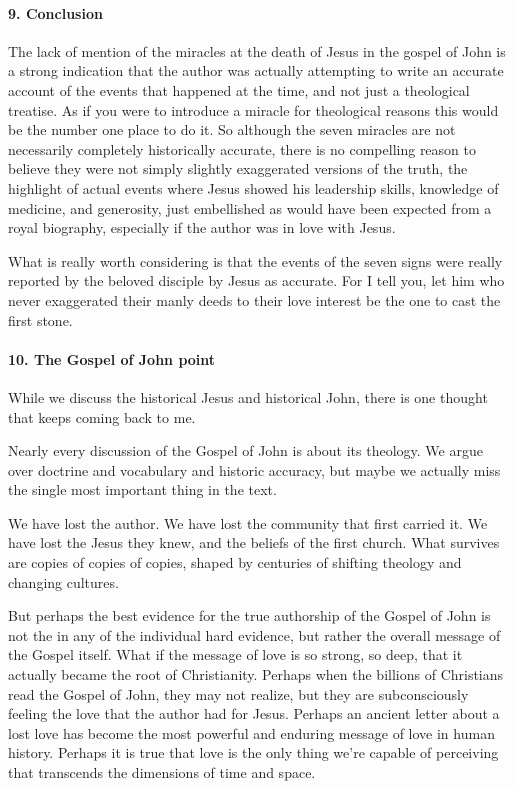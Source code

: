 \paragraph{9.
Conclusion}\label{par:conclusion}

The lack of mention of the miracles at the death of Jesus in the gospel of John is a strong indication that the author was actually attempting to write an accurate account of the events that happened at the time, and not just a theological treatise.
As if you were to introduce a miracle for theological reasons this would be the number one place to do it.
So although the seven miracles are not necessarily completely historically accurate, there is no compelling reason to believe they were not simply slightly exaggerated versions of the truth, the highlight of actual events where Jesus showed his leadership skills, knowledge of medicine, and generosity, just embellished as would have been expected from a royal biography, especially if the author was in love with Jesus.

What is really worth considering is that the events of the seven signs were really reported by the beloved disciple by Jesus as accurate.
For I tell you, let him who never exaggerated their manly deeds to their love interest be the one to cast the first stone.

\paragraph{10.
The Gospel of John point}\label{par:the-gospel-of-john-point}

While we discuss the historical Jesus and historical John, there is one thought that keeps coming back to me.

Nearly every discussion of the Gospel of John is about its theology.
We argue over doctrine and vocabulary and historic accuracy, but maybe we actually miss the single most important thing in the text.

We have lost the author.
We have lost the community that first carried it.
We have lost the Jesus they knew, and the beliefs of the first church.
What survives are copies of copies of copies, shaped by centuries of shifting theology and changing cultures.

But perhaps the best evidence for the true authorship of the Gospel of John is not the in any of the individual hard evidence, but rather the overall message of the Gospel itself.
What if the message of love is so strong, so deep, that it actually became the root of Christianity.
Perhaps when the billions of Christians read the Gospel of John, they may not realize, but they are subconsciously feeling the love that the author had for Jesus.
Perhaps an ancient letter about a lost love has become the most powerful and enduring message of love in human history.
Perhaps it is true that love is the only thing we're capable of perceiving that transcends the dimensions of time and space.

